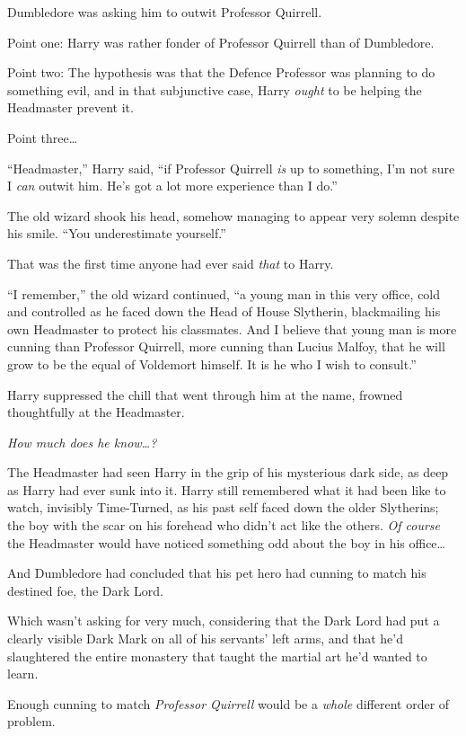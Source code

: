 Dumbledore was asking him to outwit Professor Quirrell.

Point one: Harry was rather fonder of Professor Quirrell than of
Dumbledore.

Point two: The hypothesis was that the Defence Professor was planning to
do something evil, and in that subjunctive case, Harry \emph{ought} to
be helping the Headmaster prevent it.

Point three\ldots{}

``Headmaster,'' Harry said, ``if Professor Quirrell \emph{is} up to
something, I'm not sure I \emph{can} outwit him. He's got a lot more
experience than I do.''

The old wizard shook his head, somehow managing to appear very solemn
despite his smile. ``You underestimate yourself.''

That was the first time anyone had ever said \emph{that} to Harry.

``I remember,'' the old wizard continued, ``a young man in this very
office, cold and controlled as he faced down the Head of House
Slytherin, blackmailing his own Headmaster to protect his classmates.
And I believe that young man is more cunning than Professor Quirrell,
more cunning than Lucius Malfoy, that he will grow to be the equal of
Voldemort himself. It is he who I wish to consult.''

Harry suppressed the chill that went through him at the name, frowned
thoughtfully at the Headmaster.

\emph{How much does he know\ldots{}?}

The Headmaster had seen Harry in the grip of his mysterious dark side,
as deep as Harry had ever sunk into it. Harry still remembered what it
had been like to watch, invisibly Time-Turned, as his past self faced
down the older Slytherins; the boy with the scar on his forehead who
didn't act like the others. \emph{Of course} the Headmaster would have
noticed something odd about the boy in his office\ldots{}

And Dumbledore had concluded that his pet hero had cunning to match his
destined foe, the Dark Lord.

Which wasn't asking for very much, considering that the Dark Lord had
put a clearly visible Dark Mark on all of his servants' left arms, and
that he'd slaughtered the entire monastery that taught the martial art
he'd wanted to learn.

Enough cunning to match \emph{Professor Quirrell} would be a
\emph{whole} different order of problem.

